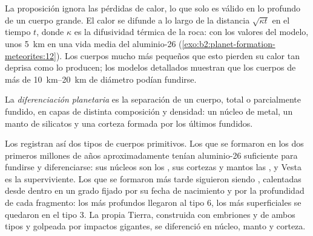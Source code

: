 \begin{omfigure}
\par{}
\end{omfigure}

La proposición ignora las pérdidas de calor, lo que solo es válido en lo profundo de un cuerpo grande.
El calor se difunde a lo largo de la distancia $\sqrt{\kappa t}$ en el tiempo $t$, donde
$\kappa$ es la difusividad térmica de la roca: con los valores del modelo,
unos \qty{5}{km} en una vida media del aluminio-26 (\cref{exo:b2:planet-formation-meteorites:12}). Los cuerpos mucho
más pequeños que esto pierden su calor tan deprisa como lo producen; los modelos detallados muestran
que los cuerpos de más de \qtyrange{10}{20}{km} de diámetro podían fundirse.

\begin{definition}
\label{def:b2:planet-formation-meteorites:differentiation}
La \emph{diferenciación planetaria} es la
separación de un cuerpo, total o parcialmente fundido, en capas de distinta
composición y densidad: un núcleo de metal, un manto de silicatos y una corteza formada por
los últimos fundidos.
\end{definition}

Los  registran así dos tipos de cuerpos primitivos. Los que se formaron en
los dos primeros millones de años aproximadamente tenían aluminio-26 suficiente para fundirse y
diferenciarse: sus núcleos son los , sus cortezas y mantos
las , y Vesta es la superviviente. Los que se formaron más tarde siguieron siendo
, calentadas desde dentro en un grado fijado por su fecha de nacimiento y por
la profundidad de cada fragmento: los más profundos llegaron al tipo 6, los más superficiales se quedaron en el
tipo 3. La propia Tierra, construida con embriones y  de ambos tipos y
golpeada por impactos gigantes, se diferenció en núcleo, manto y corteza.

